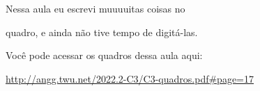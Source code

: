 \documentclass[oneside,12pt]{article}
\begin{document}
\bsk

Nessa aula eu escrevi muuuuitas coisas no

quadro, e ainda não tive tempo de digitá-las.

Você pode acessar os quadros dessa aula aqui:

\ssk

{\scriptsize

\url{http://angg.twu.net/2022.2-C3/C3-quadros.pdf\#page=17}

}

\ssk








\end{document}
